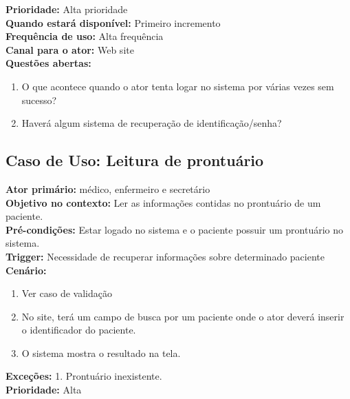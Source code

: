 \documentclass[11pt,a4paper]{report}
\begin{document}
\textbf{Prioridade:} Alta prioridade\\

\textbf{Quando estará disponível:} Primeiro incremento\\

\textbf{Frequência de uso:} Alta frequência\\

\textbf{Canal para o ator:} Web site\\

\textbf{Questões abertas:}
\begin{enumerate}
\item O que acontece quando o ator tenta logar no sistema por várias vezes sem sucesso?
\item Haverá algum sistema de recuperação de identificação/senha?\\
\end{enumerate}



\subsection{Caso de Uso: Leitura de prontuário}

\textbf{Ator primário:} médico, enfermeiro e secretário\\

\textbf{Objetivo no contexto:} Ler as informações contidas no prontuário de um paciente.\\

\textbf{Pré-condições:} Estar logado no sistema e o paciente possuir um prontuário no sistema.\\

\textbf{Trigger:} Necessidade de recuperar informações sobre determinado paciente\\

\textbf{Cenário:}
\begin{enumerate}
\item Ver caso de validação
\item No site, terá um campo de busca por um paciente onde o ator deverá inserir o identificador do paciente.
\item O sistema mostra o resultado na tela.

\end{enumerate}

\textbf{Exceções:}
1. Prontuário inexistente.\\

\textbf{Prioridade:} Alta\\
\end{document}

